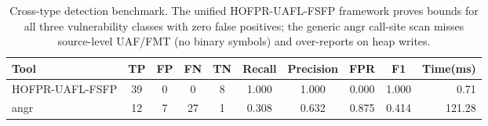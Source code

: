 \begin{table}[t]
\centering
\small
\begin{tabular}{lccccccccr}
\toprule
Tool & TP & FP & FN & TN & Recall & Precision & FPR & F1 & Time(ms) \\
\midrule
  HOFPR-UAFL-FSFP & 39 & 0 & 0 & 8 & 1.000 & 1.000 & 0.000 & 1.000 & 0.71 \\
  angr & 12 & 7 & 27 & 1 & 0.308 & 0.632 & 0.875 & 0.414 & 121.28 \\
\bottomrule
\end{tabular}
\caption{Cross-type detection benchmark. The unified HOFPR-UAFL-FSFP
framework proves bounds for all three vulnerability classes with zero
false positives; the generic angr call-site scan misses source-level
UAF/FMT (no binary symbols) and over-reports on heap writes.}
\label{tab:cross}
\end{table}
